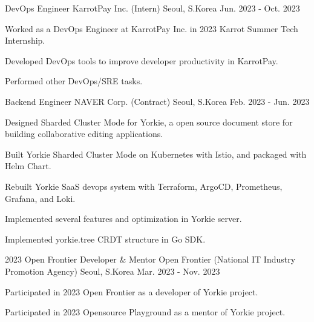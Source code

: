 

\begin{cventries}

\cventry
    {DevOps Engineer} %
    {KarrotPay Inc. (Intern)} %
    {Seoul, S.Korea} %
    {Jun. 2023 - Oct. 2023} %
    {
      \begin{cvitems} %
        \item {Worked as a DevOps Engineer at KarrotPay Inc. in 2023 Karrot Summer Tech Internship.}
        \item {Developed DevOps tools to improve developer productivity in KarrotPay.}
        \item {Performed other DevOps/SRE tasks.}
      \end{cvitems}
    }

  \cventry
    {Backend Engineer} %
    {NAVER Corp. (Contract)} %
    {Seoul, S.Korea} %
    {Feb. 2023 - Jun. 2023} %
    {
      \begin{cvitems} %
        \item {Designed Sharded Cluster Mode for Yorkie, a open source document store for building collaborative editing applications.}
        \item {Built Yorkie Sharded Cluster Mode on Kubernetes with Istio, and packaged with Helm Chart.}
        \item {Rebuilt Yorkie SaaS devops system with Terraform, ArgoCD, Prometheus, Grafana, and Loki.}
        \item {Implemented several features and optimization in Yorkie server.}
        \item {Implemented yorkie.tree CRDT structure in Go SDK.}
      \end{cvitems}
    }

  \cventry
    {2023 Open Frontier Developer \& Mentor} %
    {Open Frontier (National IT Industry Promotion Agency)} %
    {Seoul, S.Korea} %
    {Mar. 2023 - Nov. 2023} %
    {
      \begin{cvitems} %
        \item {Participated in 2023 Open Frontier as a developer of Yorkie project.}
        \item {Participated in 2023 Opensource Playground as a mentor of Yorkie project.}
      \end{cvitems}
    }


\end{cventries}

